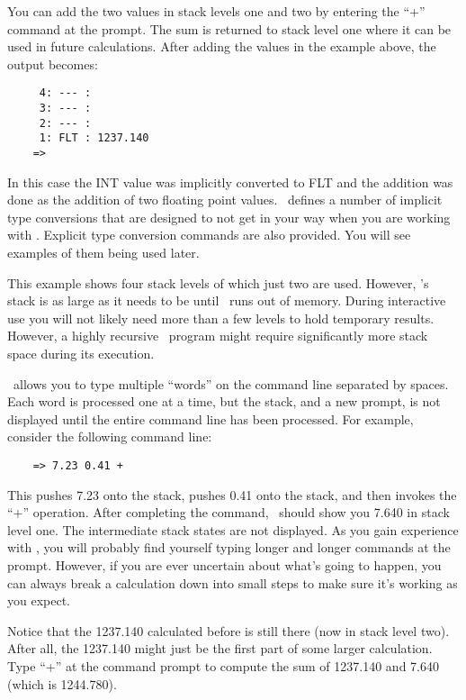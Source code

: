 You can add the two values in stack levels one and two by entering the ``+'' command at the
prompt. The sum is returned to stack level one where it can be used in future calculations.
After adding the values in the example above, the output becomes:

\begin{verbatim}
     4: --- : 
     3: --- : 
     2: --- : 
     1: FLT : 1237.140
    => 
\end{verbatim}

In this case the INT value was implicitly converted to FLT and the addition was done as the
addition of two floating point values. \CLAC\ defines a number of implicit type conversions
that are designed to not get in your way when you are working with \CLAC. Explicit type 
conversion commands are also provided. You will see examples of them being used later.

This example shows four stack levels of which just two are used. However, \CLAC's stack is as
large as it needs to be until \CLAC\ runs out of memory. During interactive use you will not
likely need more than a few levels to hold temporary results. However, a highly recursive \CLAC\
program might require significantly more stack space during its execution.

\CLAC\ allows you to type multiple ``words'' on the command line separated by spaces. Each word
is processed one at a time, but the stack, and a new prompt, is not displayed until the entire
command line has been processed. For example, consider the following command line:

\begin{verbatim}
    => 7.23 0.41 +
\end{verbatim}

This pushes 7.23 onto the stack, pushes 0.41 onto the stack, and then invokes the ``+''
operation. After completing the command, \CLAC\ should show you 7.640 in stack level one. The
intermediate stack states are not displayed. As you gain experience with \CLAC, you will
probably find yourself typing longer and longer commands at the prompt. However, if you are ever
uncertain about what's going to happen, you can always break a calculation down into small steps
to make sure it's working as you expect.

Notice that the 1237.140 calculated before is still there (now in stack level two). After all,
the 1237.140 might just be the first part of some larger calculation. Type ``+'' at the command
prompt to compute the sum of 1237.140 and 7.640 (which is 1244.780).


